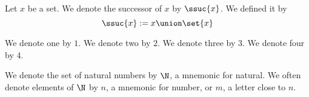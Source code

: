 %
%
%


Let $x$ be a set.
We denote the successor of $x$ by $\ssuc{x}$.
We defined it by
$$
  \ssuc{x} := x \union \set{x}
$$

We denote one by $1$.
We denote two by $2$.
We denote three by $3$.
We denote four by $4$.

We denote the set of natural numbers by $\N$, a mnemonic for natural.
We often denote elements of $\N$ by $n$, a mnemonic for number, or $m$, a letter close to $n$.
